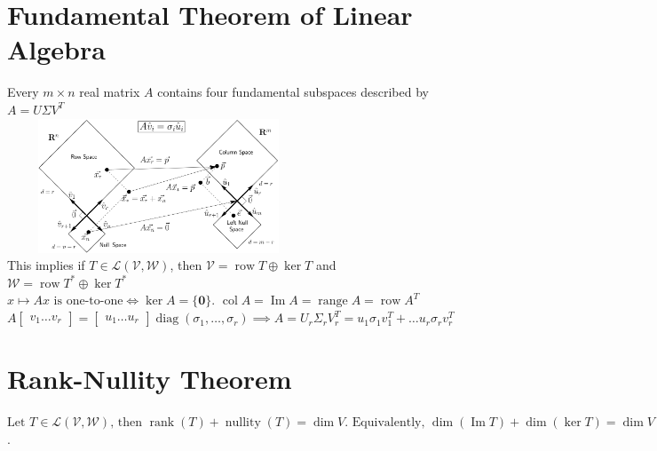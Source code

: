 \documentclass{article}
\DeclareMathOperator{\im}{Im}
\DeclareMathOperator{\rank}{rank}
\DeclareMathOperator{\range}{range}
\DeclareMathOperator{\col}{col}
\DeclareMathOperator{\row}{row}
\DeclareMathOperator{\nullity}{nullity}
\DeclareMathOperator{\diag}{diag}
\newcommand{\linear}{\mathcal{L}}
\newcommand{\V}{\mathcal{V}}
\newcommand{\W}{\mathcal{W}}
\begin{document}
\section{Fundamental Theorem of Linear Algebra}
Every $m \times n$ real matrix $A$ contains four fundamental subspaces described by $A = U\Sigma V^T$ \\

\includegraphics[width=9cm, height=4cm]{fund_thm.png} \\
This implies if $T \in \linear(\V, \W)$, then $\V = \row T \oplus \ker T$ and $\W = \row T^* \oplus \ker T^*$ \\
$x \mapsto Ax \mbox{ is one-to-one} \iff \ker A = \{\boldsymbol{0}\}$. $\col A = \im A = \range A = \row A^T$ \\
$A \begin{bmatrix} v_1 \ldots v_r \end{bmatrix} = \begin{bmatrix} u_1 \ldots u_r \end{bmatrix} \diag(\sigma_1, \dots, \sigma_r) \implies A = U_r\Sigma_r V_r^T = u_1\sigma_1 v_1^T + \ldots u_r\sigma_r v_r^T$

\section{Rank-Nullity Theorem}
${\mbox{Let } T \in \linear(\V, \W)\mbox{, then }\rank(T) + \nullity(T)= \dim V\mbox{. Equivalently, }\dim (\im T) + \dim (\ker T) = \dim V}$.
\end{document}
